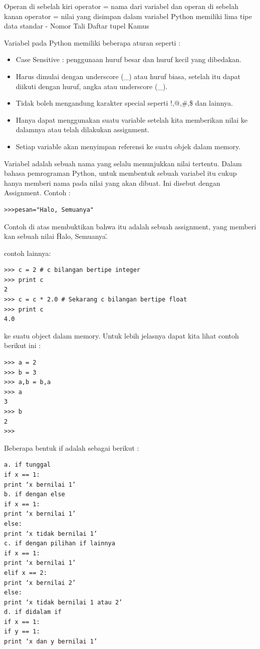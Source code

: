 Operan di sebelah kiri operator =  nama dari variabel dan operan di sebelah kanan operator = nilai yang disimpan dalam variabel
Python memiliki lima tipe data standar -
Nomor
Tali
Daftar
tupel
Kamus

Variabel pada Python memiliki beberapa aturan seperti :
\begin{itemize}
\item
Case Sensitive : penggunaan huruf besar dan huruf kecil yang dibedakan.
\item
Harus dimulai dengan underscore (\_) atau huruf biasa, setelah itu dapat diikuti dengan huruf, angka atau underscore (\_).
\item
Tidak boleh mengandung karakter special seperti !,@,\#,\$ dan lainnya.
\item
Hanya dapat menggunakan suatu variable setelah kita memberikan nilai ke dalamnya atau telah dilakukan assignment.
\item
Setiap variable akan menyimpan referensi ke suatu objek dalam memory.\cite{santoso2009bahasa}
\end{itemize}

Variabel adalah sebuah nama yang selalu menunjukkan nilai tertentu. Dalam bahasa pemrograman Python, untuk membentuk sebuah variabel itu cukup hanya memberi nama pada nilai yang akan dibuat. Ini disebut dengan Assignment.
Contoh : 
\begin{verbatim}
>>>pesan="Halo, Semuanya"
\end{verbatim}
Contoh di atas membuktikan bahwa itu adalah sebuah assignment, yang memberi kan sebuah nilai \"Halo, Semuanya\".\cite{utami2004logika}

contoh lainnya:
\begin{verbatim}
>>> c = 2 # c bilangan bertipe integer
>>> print c
2
>>> c = c * 2.0 # Sekarang c bilangan bertipe float
>>> print c
4.0
\end{verbatim}

ke suatu object dalam memory. Untuk lebih jelasnya
dapat kita lihat contoh berikut ini :
\begin{verbatim}
>>> a = 2
>>> b = 3
>>> a,b = b,a
>>> a
3
>>> b
2
>>>
\end{verbatim}

Beberapa bentuk if adalah sebagai berikut :
\begin{verbatim}
a. if tunggal
if x == 1:
print ‘x bernilai 1’
b. if dengan else
if x == 1:
print ‘x bernilai 1’
else:
print ‘x tidak bernilai 1’
c. if dengan pilihan if lainnya
if x == 1:
print ‘x bernilai 1’
elif x == 2:
print ‘x bernilai 2’
else:
print ‘x tidak bernilai 1 atau 2’
d. if didalam if
if x == 1:
if y == 1:
print ‘x dan y bernilai 1’
\end{verbatim}

